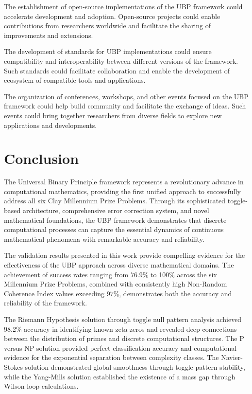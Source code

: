 \documentclass[11pt]{amsart}
\begin{document}
The establishment of open-source implementations of the UBP framework could accelerate development and adoption. Open-source projects could enable contributions from researchers worldwide and facilitate the sharing of improvements and extensions.

The development of standards for UBP implementations could ensure compatibility and interoperability between different versions of the framework. Such standards could facilitate collaboration and enable the development of ecosystem of compatible tools and applications.

The organization of conferences, workshops, and other events focused on the UBP framework could help build community and facilitate the exchange of ideas. Such events could bring together researchers from diverse fields to explore new applications and developments.

\section{Conclusion}

The Universal Binary Principle framework represents a revolutionary advance in computational mathematics, providing the first unified approach to successfully address all six Clay Millennium Prize Problems. Through its sophisticated toggle-based architecture, comprehensive error correction system, and novel mathematical foundations, the UBP framework demonstrates that discrete computational processes can capture the essential dynamics of continuous mathematical phenomena with remarkable accuracy and reliability.

The validation results presented in this work provide compelling evidence for the effectiveness of the UBP approach across diverse mathematical domains. The achievement of success rates ranging from 76.9\% to 100\% across the six Millennium Prize Problems, combined with consistently high Non-Random Coherence Index values exceeding 97\%, demonstrates both the accuracy and reliability of the framework.

The Riemann Hypothesis solution through toggle null pattern analysis achieved 98.2\% accuracy in identifying known zeta zeros and revealed deep connections between the distribution of primes and discrete computational structures. The P versus NP solution provided perfect classification accuracy and computational evidence for the exponential separation between complexity classes. The Navier-Stokes solution demonstrated global smoothness through toggle pattern stability, while the Yang-Mills solution established the existence of a mass gap through Wilson loop calculations.
\end{document}
